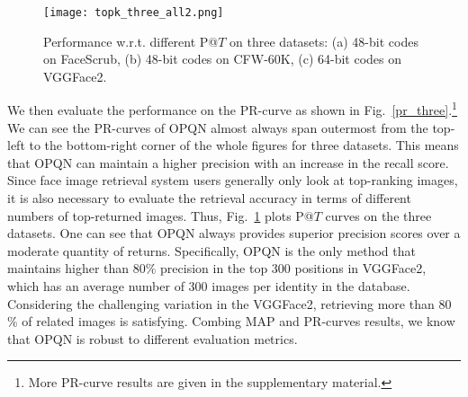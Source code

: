 \documentclass{elsarticle}
\begin{document}
\begin{figure}[!hbp]
	\centering
	\texttt{[image: topk\_three\_all2.png]}
	\caption{Performance w.r.t. different P@$T$ on three datasets: (a) 48-bit codes on FaceScrub, (b) 48-bit codes on CFW-60K, (c) 64-bit codes on VGGFace2.}
	\label{topk_three}
\end{figure}
We then evaluate the performance on the PR-curve as shown in Fig.~\ref{pr_three}.\footnote{More PR-curve results are given in the supplementary material.} We can see the PR-curves of OPQN almost always span outermost from the top-left to the bottom-right corner of the whole figures for three datasets. This means that OPQN can maintain a higher precision with an increase in the recall score. Since face image retrieval system users generally only look at top-ranking images, it is also necessary to evaluate the retrieval accuracy in terms of different numbers of top-returned images. Thus, Fig.~\ref{topk_three} plots P@$T$ curves on the three datasets. One can see that OPQN always provides superior precision scores over a moderate quantity of returns. Specifically, OPQN is the only method that maintains higher than 80$\%$ precision in the top 300 positions in VGGFace2, which has an average number of 300 images per identity in the database. Considering the challenging variation in the VGGFace2, retrieving more than 80$\%$ of related images is satisfying. Combing MAP and PR-curves results, we know that OPQN is robust to different evaluation metrics. 
\begin{comment}
\begin{figure}[!htbp]
	\centering
	\texttt{[image: face\_123\_2.png]}
	\caption{PR curve performance on the FaceScrub dataset w.r.t different code lengths: (a) 36-bit, (b) 24-bit, (c) 16-bit.}
	\label{face123_pr}
\end{figure}

\begin{figure}[!htbp]
	\centering
	\texttt{[image: cfw\_123\_2.png]}
	\caption{PR curve performance on the CFW-60K dataset w.r.t different code lengths: (a) 36-bit, (b) 24-bit, (c) 16-bit.}
	\label{cfw123_pr}
\end{figure}

\begin{figure}[!htbp]
	\centering
	\texttt{[image: vgg\_123\_2.png]}
	\caption{PR curve performance on the VGGFace2 dataset w.r.t different code lengths: (a) 48-bit, (b) 36-bit, (c) 24-bit.}
	\label{vgg123_pr}
\end{figure}
\end{comment}
\end{document}
